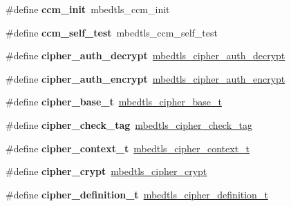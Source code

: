 \begin{DoxyCompactItemize}
\#define {\bfseries ccm\+\_\+init}~mbedtls\+\_\+ccm\+\_\+init
\item 
\mbox{\label{compat-1_83_8h_ada563027f4e1f329f962ce17f642d461}} 
\#define {\bfseries ccm\+\_\+self\+\_\+test}~mbedtls\+\_\+ccm\+\_\+self\+\_\+test
\item 
\mbox{\label{compat-1_83_8h_ac41c16752bb169e19d3ed57f5eb0b702}} 
\#define {\bfseries cipher\+\_\+auth\+\_\+decrypt}~\mbox{\hyperlink{cipher_8h_a715666cc823dc180277890b00f8a7f5e}{mbedtls\+\_\+cipher\+\_\+auth\+\_\+decrypt}}
\item 
\mbox{\label{compat-1_83_8h_a51d85c6a855f0c63a183edc4b86e4e5c}} 
\#define {\bfseries cipher\+\_\+auth\+\_\+encrypt}~\mbox{\hyperlink{cipher_8h_a65b2df023770ee3123a3f2cdb10497a0}{mbedtls\+\_\+cipher\+\_\+auth\+\_\+encrypt}}
\item 
\mbox{\label{compat-1_83_8h_a171eb2bc27a802e881ece113e74195c7}} 
\#define {\bfseries cipher\+\_\+base\+\_\+t}~\mbox{\hyperlink{structmbedtls__cipher__base__t}{mbedtls\+\_\+cipher\+\_\+base\+\_\+t}}
\item 
\mbox{\label{compat-1_83_8h_a5cd2a490b11d57931874ef47f17460bd}} 
\#define {\bfseries cipher\+\_\+check\+\_\+tag}~\mbox{\hyperlink{cipher_8h_ad3388eaa42a44db6a0b0339dd49f15ba}{mbedtls\+\_\+cipher\+\_\+check\+\_\+tag}}
\item 
\mbox{\label{compat-1_83_8h_a71946cc6e4cdbdc49d5c23fcd45f1466}} 
\#define {\bfseries cipher\+\_\+context\+\_\+t}~\mbox{\hyperlink{structmbedtls__cipher__context__t}{mbedtls\+\_\+cipher\+\_\+context\+\_\+t}}
\item 
\mbox{\label{compat-1_83_8h_a3e11f22f036dc11632daf2b1d15fd4a5}} 
\#define {\bfseries cipher\+\_\+crypt}~\mbox{\hyperlink{cipher_8h_a1c249f6ee1a0d2c906927c7790c41dc5}{mbedtls\+\_\+cipher\+\_\+crypt}}
\item 
\mbox{\label{compat-1_83_8h_a89afbda789c5b91ab9ac289374b20097}} 
\#define {\bfseries cipher\+\_\+definition\+\_\+t}~\mbox{\hyperlink{structmbedtls__cipher__definition__t}{mbedtls\+\_\+cipher\+\_\+definition\+\_\+t}}
\item 

\end{DoxyCompactItemize}
